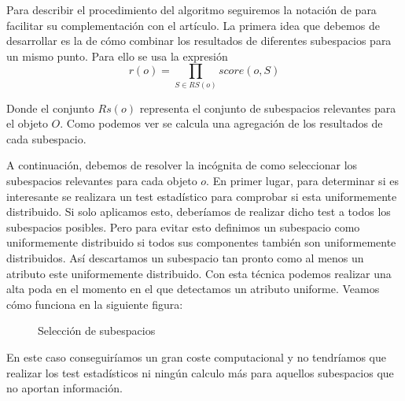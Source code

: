 Para describir el procedimiento del algoritmo seguiremos la notación de \cite{mullerAdaptiveOutliernessSubspace2010}
para facilitar su complementación con el artículo. La primera idea que debemos de desarrollar es
la de cómo combinar los resultados de diferentes subespacios para un mismo punto.
Para ello se usa la expresión
\[ r(o) = \prod_{S \in RS(o)} score(o,S)  \]

Donde el conjunto $Rs(o)$ representa el conjunto de subespacios relevantes para el objeto
$O$. Como podemos ver se calcula una agregación de los resultados de cada subespacio.

A continuación, debemos de resolver la incógnita de como seleccionar los subespacios
relevantes para cada objeto $o$. En primer lugar, para determinar si es interesante se
realizara un test estadístico para comprobar si esta uniformemente distribuido. Si 
solo aplicamos esto, deberíamos de realizar dicho test a todos los subespacios posibles.
Pero para evitar esto definimos un subespacio como uniformemente distribuido si todos sus
componentes también son uniformemente distribuidos. Así descartamos un subespacio
tan pronto como al menos un atributo este uniformemente distribuido. Con esta técnica
podemos realizar una alta poda en el momento en el que detectamos un atributo uniforme.
Veamos cómo funciona en la siguiente figura: 

\begin{figure}[h]
    \caption{\label{fig:select-subespacios} Selección de subespacios}
\end{figure}

En este caso conseguiríamos un gran coste computacional y no tendríamos que realizar los
test estadísticos ni ningún calculo más para aquellos subespacios que no aportan información.

